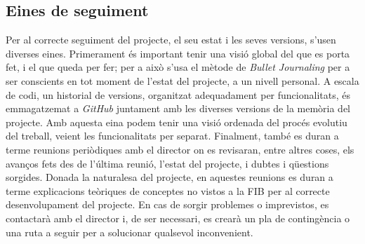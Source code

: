 \documentclass[a4paper]{report}
\begin{document}
	\subsection{Eines de seguiment}
	Per al correcte seguiment del projecte, el seu estat i les seves versions, s'usen diverses eines. Primerament és important tenir una visió global del que es porta fet, i el que queda per fer; per a això s'usa el mètode de \textit{Bullet Journaling} per a ser conscients en tot moment de l'estat del projecte, a un nivell personal. \newline
	A escala de codi, un historial de versions, organitzat adequadament per funcionalitats, és emmagatzemat a \textit{GitHub} juntament amb les diverses versions de la memòria del projecte. Amb aquesta eina podem tenir una visió ordenada del procés evolutiu del treball, veient les funcionalitats per separat.\newline
	Finalment, també es duran a terme reunions periòdiques amb el director on es revisaran, entre altres coses, els avanços fets des de l'última reunió, l'estat del projecte, i dubtes i qüestions sorgides. Donada la naturalesa del projecte, en aquestes reunions es duran a terme explicacions teòriques de conceptes no vistos a la FIB per al correcte desenvolupament del projecte.
	\newline
	En cas de sorgir problemes o imprevistos, es contactarà amb el director i, de ser necessari, es crearà un pla de contingència o una ruta a seguir per a solucionar qualsevol inconvenient.
	 
	
	
	
	\newpage
	
	\renewcommand{\bibname}{Referències}
	
	 
	
	
\end{document}
